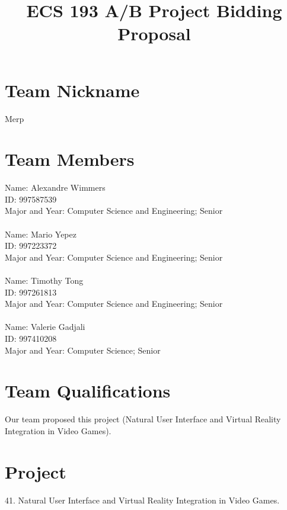 \documentclass[11pt]{article}
\title{ECS 193 A/B Project Bidding Proposal}
\date{}
\begin{document}
	
\maketitle

\section*{Team Nickname}

Merp

\section*{Team Members}

Name: Alexandre Wimmers\\
ID: 997587539\\
Major and Year: Computer Science and Engineering; Senior\\
\\
Name: Mario Yepez\\
ID: 997223372\\
Major and Year: Computer Science and Engineering; Senior\\
\\
Name: Timothy Tong\\
ID: 997261813\\
Major and Year: Computer Science and Engineering; Senior\\
\\
Name: Valerie Gadjali\\
ID: 997410208\\
Major and Year: Computer Science; Senior

\section*{Team Qualifications}

Our team proposed this project (Natural User Interface and Virtual Reality Integration in Video Games).

\pagebreak

\section*{Project}

41. Natural User Interface and Virtual Reality Integration in Video Games.
\end{document}
